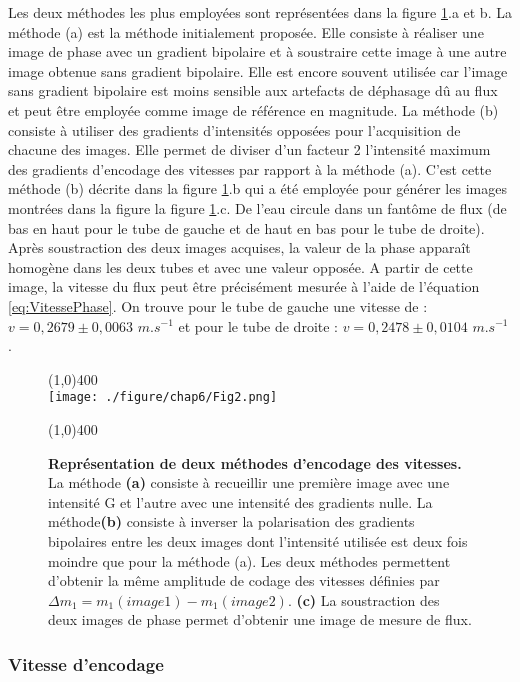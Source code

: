 Les deux méthodes les plus employées sont représentées dans la figure \ref{fig:MethodeGradientBip}.a et b. 
La méthode (a) est la méthode initialement proposée. Elle consiste à réaliser une image de phase avec un gradient bipolaire et à soustraire cette image à une autre image obtenue sans gradient bipolaire. Elle est encore souvent utilisée car l’image sans gradient bipolaire est moins sensible aux artefacts de déphasage dû au flux et peut être employée comme image de référence en magnitude.
La méthode (b) consiste à utiliser des gradients d’intensités opposées pour l’acquisition de chacune des images. Elle permet de diviser d’un facteur 2 l’intensité maximum des gradients d’encodage des vitesses par rapport à la méthode (a).
C'est cette méthode (b) décrite dans la figure \ref{fig:MethodeGradientBip}.b qui a été employée pour générer les images montrées dans la figure  la figure \ref{fig:MethodeGradientBip}.c. De l’eau circule dans un fantôme de flux (de bas en haut pour le tube de gauche et de haut en bas pour le tube de droite). Après soustraction des deux images acquises, la valeur de la phase apparaît homogène dans les deux tubes et avec une valeur opposée. A partir de cette image, la vitesse du flux peut être précisément mesurée à l'aide de l'équation \ref{eq:VitessePhase}. On trouve pour le tube de gauche une vitesse de : $v=0,2679 \pm 0,0063$ $m.s^{-1}$ et pour le tube de droite : $v=0,2478 \pm 0,0104$ $m.s^{-1}$.

\begin{figure}[h]
\centering
\line(1,0){400} \\
\texttt{[image: ./figure/chap6/Fig2.png]}
\caption[Représentation de deux méthodes d'encodage de vitesse gradient bipolaire]{\label{fig:MethodeGradientBip} \textbf{Représentation de deux méthodes d'encodage des vitesses.} La méthode \textbf{(a)} consiste à recueillir une première image avec une intensité G et l'autre avec une intensité des gradients nulle. La méthode\textbf{(b)} consiste à inverser la polarisation des gradients bipolaires entre les deux images dont l'intensité utilisée est deux fois moindre que pour la méthode (a). Les deux méthodes permettent d'obtenir la même amplitude de codage des vitesses définies par $\Delta m_1 = m_1(image1) - m_1(image2)$. \textbf{(c)} La soustraction des deux images de phase permet d'obtenir une image de mesure de flux. }
\line(1,0){400} \\ 
\end{figure}

\subsubsection{Vitesse d'encodage}

